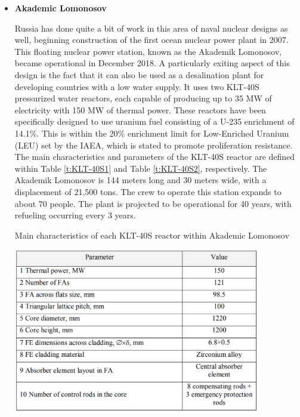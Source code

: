 \documentclass[12pt]{article}
\begin{document}
\begin{itemize}

    \item \textbf{Akademic Lomonosov}
    
    Russia has done quite a bit of work in this area of naval nuclear designs as well, beginning construction of the first ocean nuclear power plant in 2007. This floating nuclear power station, known as the Akademik Lomonosov, became operational in December 2018. A particularly exiting aspect of this design is the fact that it can also be used as a desalination plant for developing countries with a low water supply. It uses two KLT-40S pressurized water reactors, each capable of producing up to 35 MW of electricity with 150 MW of thermal power. These reactors have been specifically designed to use uranium fuel consisting of a U-235 enrichment of 14.1\%. This is within the 20\% enrichment limit for Low-Enriched Uranium (LEU) set by the IAEA, which is stated to promote proliferation resistance. The main characteristics and parameters of the KLT-40S reactor are defined within Table \ref{t:KLT-40S1} and Table \ref{t:KLT-40S2}, respectively. The Akademik Lomonosov is 144 meters long and 30 meters wide, with a displacement of 21,500 tons. The crew to operate this station expands to about 70 people. The plant is projected to be operational for 40 years, with refueling occurring every 3 years. \cite{ONPP}
    
    \begin{table}[H]
    \begin{center}
     \caption{Main characteristics of each KLT-40S reactor within Akademic Lomonosov \cite{KLT}} %
     \label{t:KLT-40S1}  %
     \includegraphics[width=0.85\textwidth]{KLT-40S1} %
    \end{center}
    \end{table}
    

\end{itemize}
\end{document}
